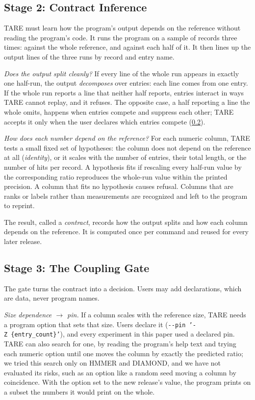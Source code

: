 \documentclass[letterpaper,twocolumn,10pt]{article}
\theoremstyle{definition}
\newcommand{\sys}{TARE\xspace}
\newcommand{\sys}{PARE\xspace}
\begin{document}
\subsection{Stage 2: Contract Inference}
\label{sec:contract}

\sys must learn how the program's output depends on the reference without reading the program's code. It runs the
program on a sample of records three times: against the whole reference, and against each half of it. It then lines
up the output lines of the three runs by record and entry name.

\textit{Does the output split cleanly?} If every line of the whole run appears in exactly one half\nobreakdash-run, the output
\textit{decomposes} over entries: each line comes from one entry. If the whole run reports a line that neither half
reports, entries interact in ways \sys cannot replay, and it refuses. The opposite case, a half reporting a line the
whole omits, happens when entries compete and suppress each other; \sys accepts it only when the user declares which
entries compete (\cref{sec:gate}).

\textit{How does each number depend on the reference?} For each numeric column, \sys tests a small fixed set of
hypotheses: the column does not depend on the reference at all (\textit{identity}), or it scales with the number of
entries, their total length, or the number of hits per record. A hypothesis fits if rescaling every half\nobreakdash-run value by
the corresponding ratio reproduces the whole\nobreakdash-run value within the printed precision. A column that fits no hypothesis
causes refusal. Columns that are ranks or labels rather than measurements are recognized and left to the program to
reprint.

The result, called a \textit{contract}, records how the output splits and how each column depends on the reference.
It is computed once per command and reused for every later release.

\subsection{Stage 3: The Coupling Gate}
\label{sec:gate}

The gate turns the contract into a decision. Users may add declarations, which are data, never program names.

\textit{Size dependence $\rightarrow$ pin.} If a column scales with the reference size, \sys needs a program option that
sets that size. Users declare it (\texttt{-{}-pin~'-Z~\{entry\_count\}'}), and every experiment in this paper used a
declared pin. \sys can also search for one, by reading the program's help text and trying each numeric option until one
moves the column by exactly the predicted ratio; we tried this search only on HMMER and DIAMOND, and we have not
evaluated its risks, such as an option like a random seed moving a column by coincidence. With the option set to the
new release's value, the program prints on a subset the numbers it would print on the whole.
\end{document}
